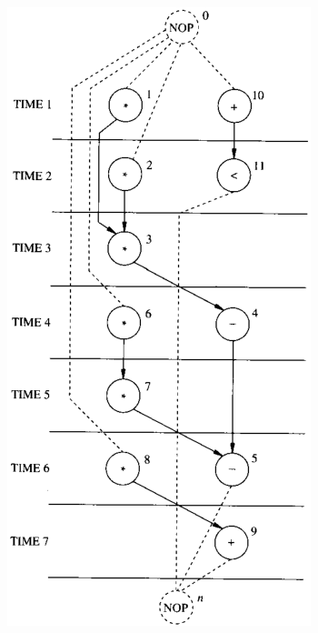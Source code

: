 \begin{figure}[H]
    \centering
    \begin{subfigure}[b]{0.3\textwidth}
        \includegraphics[width=\textwidth]{./Cap3/Images/Image19.png}

\end{subfigure}
\end{figure}
